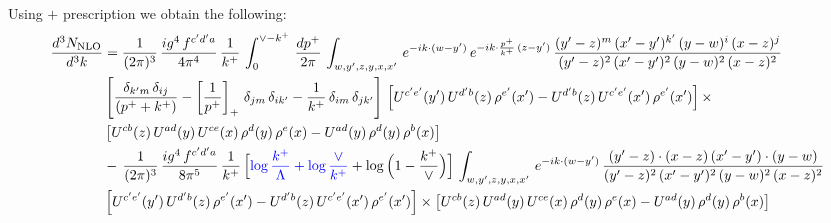 \documentclass[9pt]{article}
\numberwithin{equation}{section}
\begin{document}
Using $+$ prescription we obtain the following:
\begin{align}
    \frac{d^{3}N_{\rm NLO}}{d^{3}k} & = \frac{1}{(2\pi)^{3}}\, \frac{ig^{4}\,f^{c'd'a}}{4\pi^{4}}\, \frac{1}{k^{+}}\,\int_{0}^{\vee-k^{+}}\, \frac{dp^{+}}{2\pi}\, \int_{w,y',z,y,x,x'}\, e^{-ik\cdot (w-y')}\, e^{-ik\cdot \frac{p^{+}}{k^{+}}\,(z-y')}\, \frac{(y'-z)^{m}\,(x'-y')^{k'}\,(y-w)^{i}\,(x-z)^{j}}{(y'-z)^{2}\,(x'-y')^{2}\,(y-w)^{2}\,(x-z)^{2}}\notag \\ & \left[\frac{\delta_{k'm}\,\delta_{ij}}{(p^{+}+k^{+})}-\left[\frac{1}{p^{+}}\right]_{+}\,\delta_{jm}\,\delta_{ik'}-\frac{1}{k^{+}}\, \delta_{im}\, \delta_{jk'}\right]\, \left[U^{c'e'}(y')\,U^{d'b}(z)\,\rho^{e'}(x')-U^{d'b}(z)\,U^{c'e'}(x')\,\rho^{e'}(x')\right]\times\notag \\ &  \left[U^{cb}(z)\,U^{ad}(y)\,U^{ce}(x)\,\rho^{d}(y)\,\rho^{e}(x)-U^{ad}(y)\,\rho^{d}(y)\,\rho^{b}(x)\right]\notag \\ &  -\,\frac{1}{(2\pi)^{3}}\, \frac{ig^{4}\,f^{c'd'a}}{8\pi^{5}}\, \frac{1}{k^{+}}\,\Big[{\color{blue}\log\frac{k^{+}}{\Lambda}+\log\frac{\vee}{k^{+}}}+\log\Big(1-\frac{k^{+}}{\vee}\Big)\Big]\, \int_{w,y',z,y,x,x'}\, e^{-ik\cdot (w-y')}\, \frac{(y'-z)\cdot (x-z)\,(x'-y')\cdot (y-w)}{(y'-z)^{2}\,(x'-y')^{2}\,(y-w)^{2}\,(x-z)^{2}}\notag \\ & \left[U^{c'e'}(y')\,U^{d'b}(z)\,\rho^{e'}(x')-U^{d'b}(z)\,U^{c'e'}(x')\,\rho^{e'}(x')\right]\times  \left[U^{cb}(z)\,U^{ad}(y)\,U^{ce}(x)\,\rho^{d}(y)\,\rho^{e}(x)-U^{ad}(y)\,\rho^{d}(y)\,\rho^{b}(x)\right]
\end{align}
\end{document}
